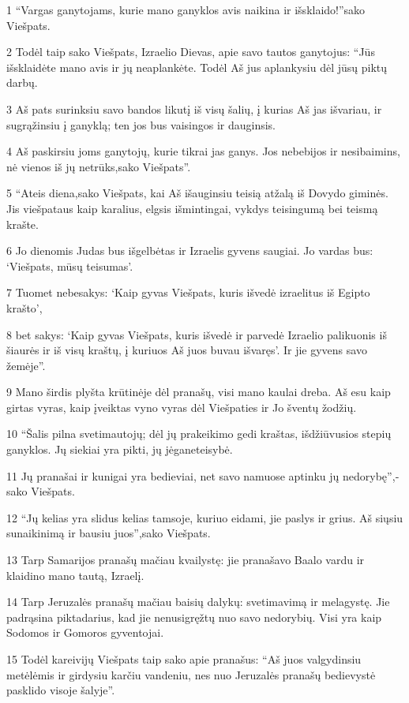 \par 1 “Vargas ganytojams, kurie mano ganyklos avis naikina ir išsklaido!”­sako Viešpats. 
\par 2 Todėl taip sako Viešpats, Izraelio Dievas, apie savo tautos ganytojus: “Jūs išsklaidėte mano avis ir jų neaplankėte. Todėl Aš jus aplankysiu dėl jūsų piktų darbų. 
\par 3 Aš pats surinksiu savo bandos likutį iš visų šalių, į kurias Aš jas išvariau, ir sugrąžinsiu į ganyklą; ten jos bus vaisingos ir dauginsis. 
\par 4 Aš paskirsiu joms ganytojų, kurie tikrai jas ganys. Jos nebebijos ir nesibaimins, nė vienos iš jų netrūks,­sako Viešpats”. 
\par 5 “Ateis diena,­sako Viešpats,­ kai Aš išauginsiu teisią atžalą iš Dovydo giminės. Jis viešpataus kaip karalius, elgsis išmintingai, vykdys teisingumą bei teismą krašte. 
\par 6 Jo dienomis Judas bus išgelbėtas ir Izraelis gyvens saugiai. Jo vardas bus: ‘Viešpats, mūsų teisumas’. 
\par 7 Tuomet nebesakys: ‘Kaip gyvas Viešpats, kuris išvedė izraelitus iš Egipto krašto’, 
\par 8 bet sakys: ‘Kaip gyvas Viešpats, kuris išvedė ir parvedė Izraelio palikuonis iš šiaurės ir iš visų kraštų, į kuriuos Aš juos buvau išvaręs’. Ir jie gyvens savo žemėje”. 
\par 9 Mano širdis plyšta krūtinėje dėl pranašų, visi mano kaulai dreba. Aš esu kaip girtas vyras, kaip įveiktas vyno vyras dėl Viešpaties ir Jo šventų žodžių. 
\par 10 “Šalis pilna svetimautojų; dėl jų prakeikimo gedi kraštas, išdžiūvusios stepių ganyklos. Jų siekiai yra pikti, jų jėga­neteisybė. 
\par 11 Jų pranašai ir kunigai yra bedieviai, net savo namuose aptinku jų nedorybę”,­sako Viešpats. 
\par 12 “Jų kelias yra slidus kelias tamsoje, kuriuo eidami, jie paslys ir grius. Aš siųsiu sunaikinimą ir bausiu juos”,­sako Viešpats. 
\par 13 Tarp Samarijos pranašų mačiau kvailystę: jie pranašavo Baalo vardu ir klaidino mano tautą, Izraelį. 
\par 14 Tarp Jeruzalės pranašų mačiau baisių dalykų: svetimavimą ir melagystę. Jie padrąsina piktadarius, kad jie nenusigręžtų nuo savo nedorybių. Visi yra kaip Sodomos ir Gomoros gyventojai. 
\par 15 Todėl kareivijų Viešpats taip sako apie pranašus: “Aš juos valgydinsiu metėlėmis ir girdysiu karčiu vandeniu, nes nuo Jeruzalės pranašų bedievystė pasklido visoje šalyje”. 
